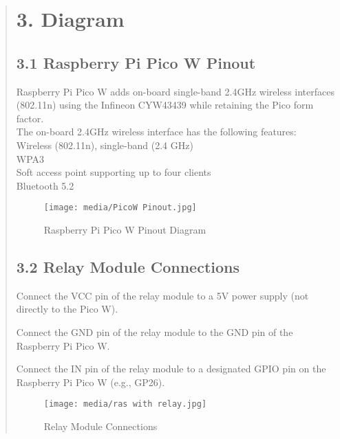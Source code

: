 \documentclass[12pt]{report}
\begin{document}
			
	\clearpage
	
	
	\begin{quote}
		\section{3. Diagram}
		
			\subsection{3.1 Raspberry Pi Pico W Pinout}
			Raspberry Pi Pico W adds on-board single-band 2.4GHz wireless interfaces (802.11n) using the Infineon CYW43439 while retaining the Pico form factor.\\
			The on-board 2.4GHz wireless interface has the following features:\\
			Wireless (802.11n), single-band (2.4 GHz)\\
			WPA3\\
			Soft access point supporting up to four clients\\
			Bluetooth 5.2
			
			\begin{figure}
				\centering
				\texttt{[image: media/PicoW Pinout.jpg]}\\
				\caption{Raspberry Pi Pico W Pinout Diagram}
			\end{figure}
			
		\clearpage
		
		
		\subsection{3.2 Relay Module Connections}
		Connect the VCC pin of the relay module to a 5V power supply (not directly to the Pico W).
		
		Connect the GND pin of the relay module to the GND pin of the Raspberry Pi Pico W.
		
		Connect the IN pin of the relay module to a designated GPIO pin on the Raspberry Pi Pico W (e.g., GP26).
		\begin{figure}
			\centering
			\texttt{[image: media/ras with relay.jpg]}\\
			\caption{Relay Module Connections}
		\end{figure}
			

\end{quote}
\end{document}
